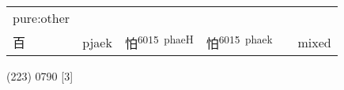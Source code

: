 \documentclass[14pt,a4paper]{scrartcl}
\begin{document}
\begin{longtable}[c]{@{}llllll@{}}
\begin{minipage}[t]{0.14\columnwidth}\raggedright\strut
pure:other
\strut\end{minipage}\tabularnewline
\begin{minipage}[t]{0.14\columnwidth}\raggedright\strut
百
\strut\end{minipage} &
\begin{minipage}[t]{0.14\columnwidth}\raggedright\strut
pjaek
\strut\end{minipage} &
\begin{minipage}[t]{0.14\columnwidth}\raggedright\strut
怕\textsuperscript{6015~phaeH}
\strut\end{minipage} &
\begin{minipage}[t]{0.14\columnwidth}\raggedright\strut
怕\textsuperscript{6015~phaek}
\strut\end{minipage} &
\begin{minipage}[t]{0.14\columnwidth}\raggedright\strut
\strut\end{minipage} &
\begin{minipage}[t]{0.14\columnwidth}\raggedright\strut
mixed
\strut\end{minipage}\tabularnewline
\bottomrule
\end{longtable}

(223) 0790 {[}3{]}
\end{document}
